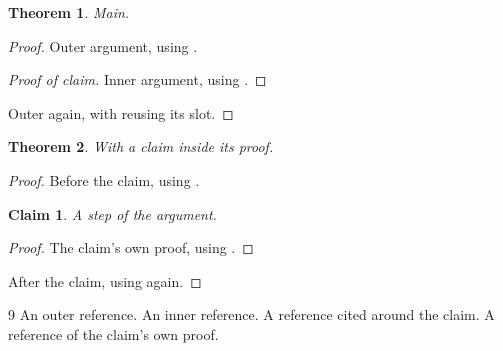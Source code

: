 \documentclass{article}
\newtheorem{theorem}{Theorem}
\newtheorem{claim}{Claim}
\begin{document}
\begin{theorem}\label{thm:main_result}Main.\end{theorem}
\begin{proof}
  Outer argument, using \cite{Outer_Ref_2011}.
  \begin{proof}[Proof of claim]
    Inner argument, using \cite[Lemma 2]{Inner_Ref_2020}.
  \end{proof}
  Outer again, with \cite{Outer_Ref_2011} reusing its slot.
\end{proof}

\begin{theorem}\label{thm:with_claim}With a claim inside its proof.\end{theorem}
\begin{proof}
  Before the claim, using \cite{Around_Ref_2013}.
  \begin{claim}\label{clm:step}A step of the argument.\end{claim}
  \begin{proof}
    The claim's own proof, using \cite{Claim_Ref_2015}.
  \end{proof}
  After the claim, using \cite{Around_Ref_2013} again.
\end{proof}

\begin{thebibliography}{9}
An outer reference.
An inner reference.
A reference cited around the claim.
A reference of the claim's own proof.
\end{thebibliography}
\end{document}
